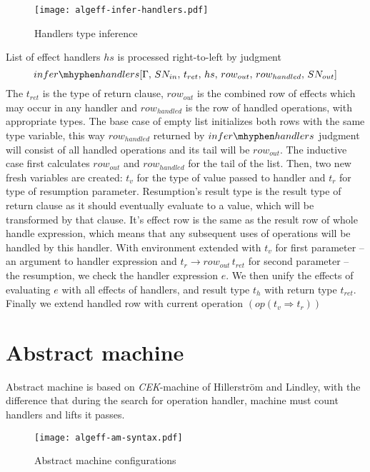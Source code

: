 \documentclass[inz, english, shortabstract]{iithesis}
\begin{document}
\begin{figure}
  \centering
  \texttt{[image: algeff-infer-handlers.pdf]}
  \caption{Handlers type inference} 
  \label{fig:algeff-infer-handlers} 
\end{figure} 

List of effect handlers $ hs $ is processed right-to-left by judgment 
$$ infer\mhyphen handlers [\Gamma , \, SN_{in} , \, t_{ret} , \, hs , \, row_{out} , \, row_{handled} , \, SN_{out}] $$
The $ t_{ret} $ is the type of return clause, $ row_{out} $ is the combined row of effects which may occur in any handler and $ row_{handled} $ is the row of handled operations, with appropriate types.
The base case of empty list initializes both rows with the same type variable, this way $ row_{handled} $ returned by $infer\mhyphen handlers$ judgment will consist of all handled operations and its tail will be $ row_{out} $.
The inductive case first calculates $ row_{out} $ and $ row_{handled} $ for the tail of the list.
Then, two new fresh variables are created: $ t_v $ for the type of value passed to handler and $ t_r $ for type of resumption parameter.
Resumption's result type is the result type of return clause as it should eventually evaluate to a value, which will be transformed by that clause.
It's effect row is the same as the result row of whole handle expression, which means that any subsequent uses of operations will be handled by this handler.
With environment extended with $ t_v $ for first parameter -- an argument to handler expression and $ t_r \rightarrow row_{out} \, t_{ret} $ for second parameter -- the resumption, we check the handler expression $ e $.
We then unify the effects of evaluating $ e $ with all effects of handlers, and result type $ t_{h} $ with return type $ t_{ret} $.
Finally we extend handled row with current operation $ (op (t_v \Rightarrow t_r)) $

\section{Abstract machine}
Abstract machine is based on \emph{CEK}-machine of Hillerström and Lindley\cite{Hillerstrom2016}, with the difference that during the search for operation handler, machine must count handlers and lifts it passes.

\begin{figure}
  \centering
  \texttt{[image: algeff-am-syntax.pdf]}
  \caption{Abstract machine configurations}
  \label{fig:algeff-am-syntax}
\end{figure}
\end{document}
